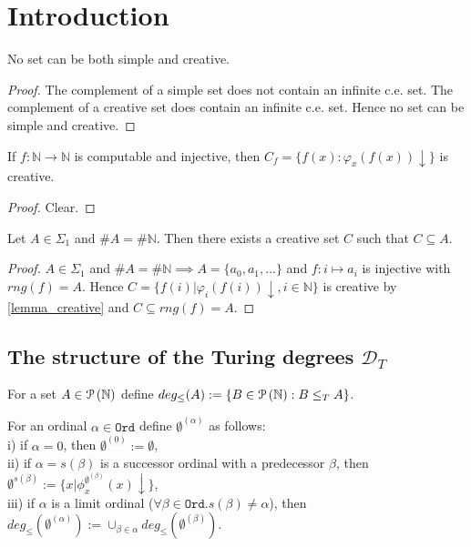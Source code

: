 \chapter{Introduction}

\begin{proposition}
No set can be both simple and creative.
\end{proposition}

\begin{proof}
The complement of a simple set does not contain an infinite c.e. set. The complement of a creative set does contain an infinite c.e. set. Hence no set can be simple and creative.
\end{proof}

\begin{lemma}\label{lemma_creative}
If $f : \mathbb{N} \to \mathbb{N}$ is computable and injective, then $C_f = \{f(x) : \varphi_x(f(x))\downarrow \}$ is creative.
\end{lemma}
\begin{proof}
Clear.
\end{proof}

\begin{proposition}
Let $A \in \Sigma_1$ and $\#A = \#\mathbb{N}$. Then there exists a creative set $C$ such that $C \subseteq A$.
\end{proposition}

\begin{proof}
$A \in \Sigma_1$ and $\#A = \#\mathbb{N} \implies A=\{a_0, a_1, ... \}$ and $f:i \mapsto a_i$ is injective with $rng(f)=A$. 
Hence $C=\{f(i) | \varphi_i(f(i))\downarrow, i \in \mathbb{N}\}$ is creative by \autoref{lemma_creative} and $C \subseteq	 rng(f) = A$.
\end{proof}

\section{The structure of the Turing degrees $\mathcal{D}_T$}

\begin{defn}For a set $A \in \mathcal{P} \left({ \mathbb{N} }\right)$ define $deg_\le(A):=\{B \in \mathcal{P} \left({ \mathbb{N} }\right) : B \le_T A \}$.
\end{defn}

\begin{defn}For an ordinal $\alpha \in \mathtt{Ord}$ define $\emptyset^{(\alpha)}$ as follows:\\
i) if $\alpha=0$, then $\emptyset^{(0)}:=\emptyset$,\\
ii) if $\alpha=s(\beta)$ is a successor ordinal with a predecessor $\beta$, then $\emptyset^{s(\beta)}:=\{x | \phi^{\emptyset^{(\beta)}}_x(x) \downarrow \}$,\\
iii) if $\alpha$ is a limit ordinal ($\forall \beta \in \mathtt{Ord}. s(\beta) \not = \alpha$), then $deg_\le(\emptyset^{(\alpha)}):=\cup_{\beta \in \alpha} deg_\le(\emptyset^{(\beta)})$.
\end{defn}


